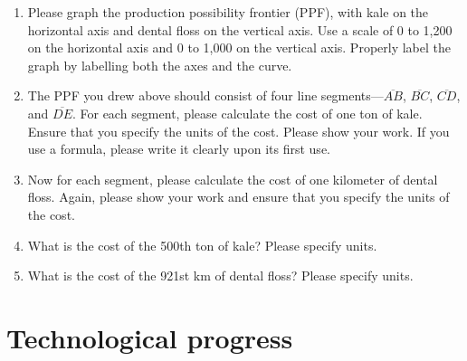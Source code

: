 \documentclass{assignment}
\begin{document}
\begin{enumerate}

\item Please graph the production possibility frontier (PPF), with kale on the horizontal axis and dental floss on the vertical axis. Use a scale of 0 to 1,200 on the horizontal axis and 0 to 1,000 on the vertical axis. Properly label the graph by labelling both the axes and the curve.

\vspace{12pt}
\begin{center}
\end{center}
\vspace{24pt}

\item The PPF you drew above should consist of four line segments---$\overline{AB}$, $\overline{BC}$, $\overline{CD}$, and $\overline{DE}$. For each segment, please calculate the cost of one ton of kale. Ensure that you specify the units of the cost. Please show your work. If you use a formula, please write it clearly upon its first use.

\clearpage

\item Now for each segment, please calculate the cost of one kilometer of dental floss. Again, please show your work and ensure that you specify the units of the cost.

\vfill

\item What is the cost of the 500th ton of kale? Please specify units.

\vspace{5\baselineskip}

\item What is the cost of the 921st km of dental floss? Please specify units.

\vspace{5\baselineskip}

\end{enumerate}

\clearpage

\section{Technological progress}
\end{document}
